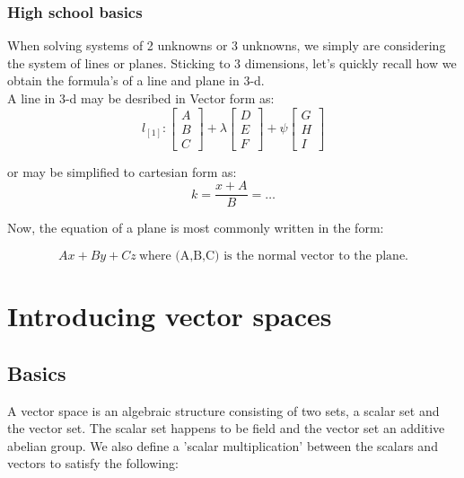 \documentclass{article}
\numberwithin{equation}{subsection}
\begin{document}
\subsubsection{High school basics}

When solving systems of 2 unknowns or 3 unknowns, we simply are considering the system of lines or planes. Sticking to 3 dimensions, let's quickly recall how we obtain the formula's of a line and plane in 3-d. 
\\
A line in 3-d may be desribed in Vector form as:
\begin{equation*}
    l_[1] : \begin{bmatrix}
        A\\
        B\\
        C
    \end{bmatrix}
    + 
    \lambda\begin{bmatrix}
        D\\
        E\\
        F
    \end{bmatrix}
    +
    \psi\begin{bmatrix}
        G\\
        H\\
        I
    \end{bmatrix}
\end{equation*}

or may be simplified to cartesian form as: 
\begin{equation*}
    k = \frac{x + A}{B} = \ldots
\end{equation*}

Now, the equation of a plane is most commonly written in the form: 

\begin{equation*}
    Ax + By + Cz \ \text{where (A,B,C) is the normal vector to the plane.}
\end{equation*}

\section{Introducing vector spaces}
\subsection{Basics}
A vector space is an algebraic structure consisting of two sets, a scalar set and the vector set. The scalar set happens to be field and the vector set an additive abelian group. We also define a 'scalar multiplication' between the scalars and vectors to satisfy the following:
\end{document}
